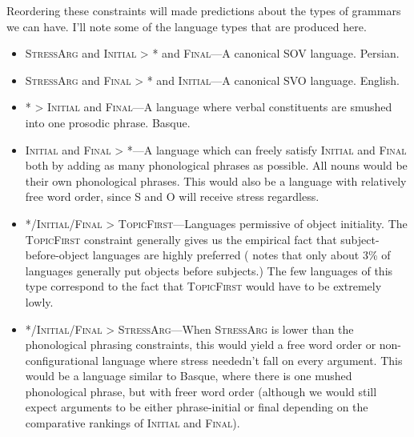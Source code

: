 \documentclass{article}
\newcommand{\topf}{\textsc{TopicFirst}}
\newcommand{\starg}{\textsc{StressArg}}
\newcommand{\troc}{\textsc{Initial{\textphi}}}
\newcommand{\iamb}{\textsc{Final{\textphi}}}
\newcommand{\nophi}{\textsc{*{\textphi}}}
\begin{document}
Reordering these constraints will made predictions about the types of grammars we can have. I'll note some of the language types that are produced here.

\begin{itemize}
\item {\starg} and {\troc} {\textgreater} {\nophi} and {\iamb}---A canonical SOV language. Persian.
\item {\starg} and {\iamb} {\textgreater} {\nophi} and {\troc}---A canonical SVO language. English.
\item {\nophi} {\textgreater} {\troc} and {\iamb}---A language where verbal constituents are smushed into one prosodic phrase. Basque.
\item {\troc} and {\iamb} {\textgreater} {\nophi}---A language which can freely satisfy {\troc} and {\iamb} both by adding as many phonological phrases as possible. All nouns would be their own phonological phrases. This would also be a language with relatively free word order, since S and O will receive stress regardless.
\item  {\nophi}/{\troc}/{\iamb} {\textgreater} {\topf}---Languages permissive of object initiality. The {\topf} constraint generally gives us the empirical fact that subject-before-object languages are highly preferred (\textcite{dryer13} notes that only about 3\% of languages generally put objects before subjects.) The few languages of this type correspond to the fact that {\topf} would have to be extremely lowly.
\item {\nophi}/{\troc}/{\iamb} {\textgreater} {\starg}---When {\starg} is lower than the phonological phrasing constraints, this would yield a free word order or non-configurational language where stress neededn't fall on every argument. This would be a language similar to Basque, where there is one mushed phonological phrase, but with freer word order (although we would still expect arguments to be either phrase-initial or final depending on the comparative rankings of {\troc} and {\iamb}).
\end{itemize}


\end{document}
